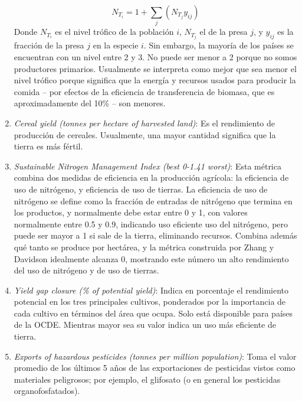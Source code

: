 \documentclass[a4paper,12pt]{amsart}
\begin{document}
\begin{enumerate}
\begin{equation}
            N_{T_i} = 1 + \sum_j\left(N_{T_j}y_{ij}\right) 
        \end{equation}
        Donde $N_{T_i}$ es el nivel trófico de la población $i$, $N_{T_j}$ el de la presa $j$, y $y_{ij}$ es la fracción de la presa $j$ en la especie $i$. Sin embargo, la mayoría de los países se encuentran con un nivel entre 2 y 3. No puede ser menor a 2 porque no somos productores primarios. Usualmente se interpreta como mejor que sea menor el nivel trófico porque significa que la energía y recursos usados para producir la comida – por efectos de la eficiencia de transferencia de biomasa, que es aproximadamente del 10\% \cite{noauthor_calculating_nodate} – son menores.
        \item \emph{Cereal yield (tonnes per hectare of harvested land)}: Es el rendimiento de producción de cereales. Usualmente, una mayor cantidad significa que la tierra es más fértil. 
        \item \emph{Sustainable Nitrogen Management Index (best 0-1.41 worst)}: Esta métrica combina dos medidas de eficiencia en la producción agrícola: la eficiencia de uso de nitrógeno, y eficiencia de uso de tierras. La eficiencia de uso de nitrógeno se define como la fracción de entradas de nitrógeno que termina en los productos, y normalmente debe estar entre 0 y 1, con valores normalmente entre 0.5 y 0.9\cite{zhang_sustainable_2019}, indicando uso eficiente uso del nitrógeno, pero puede ser mayor a 1 si sale de la tierra, eliminando recursos. Combina además qué tanto se produce por hectárea, y la métrica construida por Zhang y Davidson idealmente alcanza 0, mostrando este número un alto rendimiento del uso de nitrógeno y de uso de tierras. 
        \item \emph{Yield gap closure (\% of potential yield)}: Indica en porcentaje el rendimiento potencial en los tres principales cultivos, ponderados por la importancia de cada cultivo en términos del área que ocupa. Solo está disponible para países de la OCDE. Mientras mayor sea su valor indica un uso más eficiente de tierra. 
        \item \emph{Exports of hazardous pesticides (tonnes per million population)}: Toma el valor promedio de los últimos 5 años de las exportaciones de pesticidas vistos como materiales peligrosos; por ejemplo, el glifosato (o en general los pesticidas organofosfatados).
    \end{enumerate}
\end{document}
